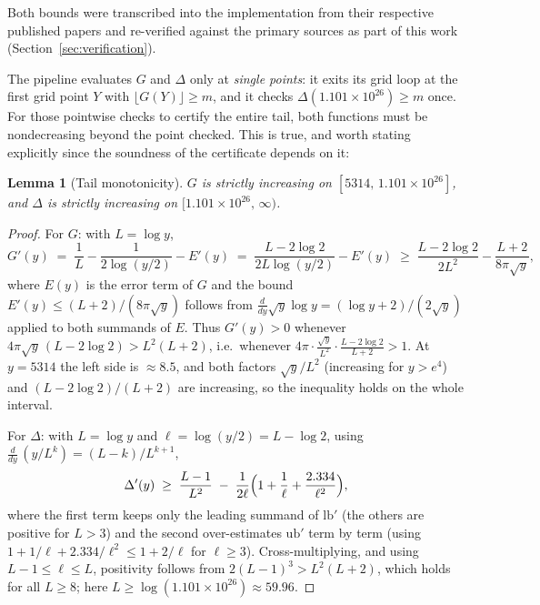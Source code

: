 \documentclass[11pt]{amsart}
\newtheorem{lemma}{Lemma}
\begin{document}
Both bounds were transcribed into the implementation from their
respective published papers and re-verified against the primary sources
as part of this work (Section~\ref{sec:verification}).

The pipeline evaluates $G$ and $\Delta$ only at \emph{single points}: it
exits its grid loop at the first grid point $Y$ with
$\lfloor G(Y)\rfloor \geq m$, and it checks
$\Delta(1.101\times10^{26}) \geq m$ once. For those pointwise checks to
certify the entire tail, both functions must be nondecreasing beyond the
point checked. This is true, and worth stating explicitly since the
soundness of the certificate depends on it:

\begin{lemma}[Tail monotonicity]
\label{lem:tailmono}
$G$ is strictly increasing on $[5314,\, 1.101\times10^{26}]$, and
$\Delta$ is strictly increasing on $[1.101\times10^{26},\, \infty)$.
\end{lemma}

\begin{proof}
For $G$: with $L = \log y$,
\[
  G'(y) \;=\; \frac{1}{L} - \frac{1}{2\log(y/2)} - E'(y)
  \;=\; \frac{L - 2\log 2}{2L\log(y/2)} - E'(y)
  \;\geq\; \frac{L - 2\log 2}{2L^2} - \frac{L+2}{8\pi\sqrt{y}},
\]
where $E(y)$ is the error term of $G$ and the bound
$E'(y) \leq (L+2)/(8\pi\sqrt y)$ follows from
$\frac{d}{dy}\sqrt{y}\log y = (\log y + 2)/(2\sqrt y)$ applied to both
summands of $E$. Thus $G'(y) > 0$ whenever
$4\pi\sqrt{y}\,(L - 2\log 2) > L^2(L+2)$, i.e.\ whenever
$4\pi \cdot \frac{\sqrt y}{L^2}\cdot\frac{L-2\log2}{L+2} > 1$. At
$y = 5314$ the left side is $\approx 8.5$, and both factors
$\sqrt{y}/L^{2}$ (increasing for $y > e^{4}$) and $(L-2\log2)/(L+2)$
are increasing, so the inequality holds on the whole interval.

For $\Delta$: with $L = \log y$ and $\ell = \log(y/2) = L - \log 2$, using
$\frac{d}{dy}\,(y/L^k) = (L-k)/L^{k+1}$,
\[
  \Delta'(y) \;\geq\; \frac{L-1}{L^{2}}
  \;-\; \frac{1}{2\ell}\Bigl(1 + \frac{1}{\ell} + \frac{2.334}{\ell^{2}}\Bigr),
\]
where the first term keeps only the leading summand of
$\mathrm{lb}'$ (the others are positive for $L > 3$) and the second
over-estimates $\mathrm{ub}'$ term by term (using
$1 + 1/\ell + 2.334/\ell^2 \leq 1 + 2/\ell$ for $\ell \geq 3$).
Cross-multiplying, and using $L-1 \leq \ell \leq L$, positivity follows
from $2(L-1)^3 > L^2(L+2)$, which holds for all $L \geq 8$; here
$L \geq \log(1.101\times10^{26}) \approx 59.96$.
\end{proof}
\end{document}
